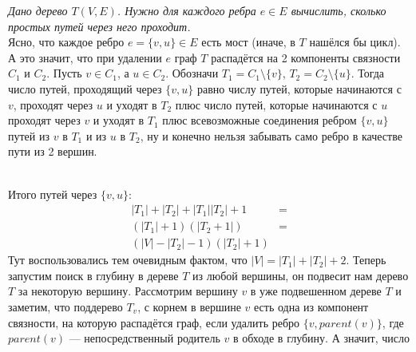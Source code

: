 \textit{Дано дерево $T(V,E)$. Нужно для каждого ребра $e\in E$ вычислить, сколько простых путей через него проходит.}\\
Ясно, что каждое ребро $e=\lbrace v,u \rbrace \in E$ есть мост (иначе, в $T$ нашёлся бы цикл). А это значит, что при удалении $e$ 
граф $T$ распадётся на 2 компоненты связности $C_1$ и $C_2$. Пусть $v\in C_1$, а $u \in C_2$. Обозначи $T_1=C_1\setminus \lbrace v \rbrace$, $T_2=C_2\setminus \lbrace u \rbrace$. Тогда число путей, проходящий через $\lbrace v, u \rbrace$ равно числу путей, 
которые начинаются с $v$, проходят через $u$ и уходят в $T_2$ плюс число путей,
которые начинаются с $u$ проходят через $v$ и уходят в $T_1$ плюс всевозможные соединения ребром $\lbrace v,u \rbrace$ путей из 
$v$ в $T_1$ и из $u$ в $T_2$, ну и конечно нельзя забывать само ребро в качестве пути из 2 вершин.
\begin{figure}[ht!]
\centering
\end{figure}\\
Итого путей через $\lbrace v,u \rbrace$:
\begin{equation*}
\begin{split}
|T_1|+|T_2|+|T_1||T_2|+1 &=\\
(|T_1|+1)(|T_2+1|) &=\\
(|V|-|T_2|-1)(|T_2| + 1)
\end{split}
\end{equation*}
Тут воспользовались тем очевидным фактом, что $|V|=|T_1|+|T_2|+2$. Теперь запустим поиск в глубину в дереве $T$ из любой
вершины, он подвесит нам дерево $T$ за некоторую вершину. Рассмотрим вершину $v$ в уже подвешенном дереве $T$ и заметим,
что поддерево $T_v$, с корнем в вершине $v$ есть одна из компонент связности, на которую распадётся граф, если удалить ребро
$\lbrace v, parent(v) \rbrace$, где $parent(v)$ --- непосредственный родитель $v$ в обходе в глубину. А значит, число
